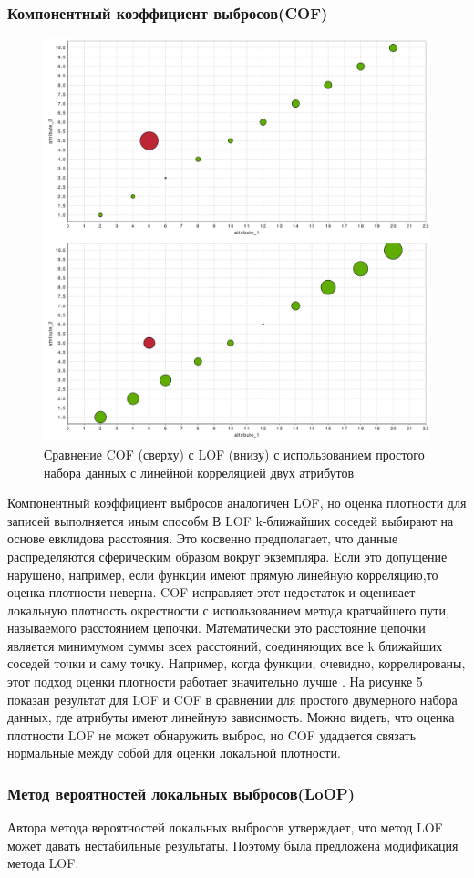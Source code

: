  \subsubsection{Компонентный коэффициент выбросов(COF)}
 \begin{figure}[h!]
 	\centering
 	\includegraphics[width=.5\textwidth]{img/5_3rdpart.png}
 	\caption{Сравнение COF (сверху) с LOF (внизу) с использованием простого набора данных с линейной корреляцией двух атрибутов}
 	\label{fig05}
 \end{figure}
 Компонентный коэффициент выбросов аналогичен LOF, но оценка плотности для записей выполняется иным способм В LOF k-ближайших соседей выбирают на основе евклидова расстояния. Это косвенно предполагает, что данные распределяются сферическим образом вокруг экземпляра. Если это допущение нарушено, например, если функции имеют прямую линейную корреляцию,то оценка плотности неверна. COF исправляет этот недостаток и оценивает локальную плотность окрестности с использованием метода кратчайшего пути, называемого расстоянием цепочки. Математически это расстояние цепочки является минимумом суммы всех расстояний, соединяющих все k  ближайших соседей точки и саму точку. Например, когда функции, очевидно, коррелированы, этот подход оценки плотности работает значительно лучше \cite{Book14}. 
 На рисунке 5 показан результат для LOF и COF в сравнении для простого двумерного набора данных, где атрибуты имеют линейную зависимость. Можно видеть, что оценка  плотности LOF не может обнаружить выброс, но COF удадается связать  нормальные между собой для оценки локальной плотности.
 \subsubsection{Метод вероятностей локальных выбросов(LoOP)}
 Автора метода вероятностей локальных выбросов утверждает, что метод LOF может давать нестабильные  результаты\cite{Book18}. Поэтому была предложена модификация метода LOF.
 
